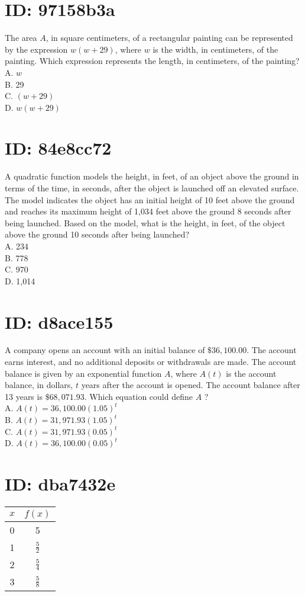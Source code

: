 \section*{ID: 97158b3a}
The area $A$, in square centimeters, of a rectangular painting can be represented by the expression $w(w+29)$, where $w$ is the width, in centimeters, of the painting. Which expression represents the length, in centimeters, of the painting?\\
A. $w$\\
B. 29\\
C. $(w+29)$\\
D. $w(w+29)$

\section*{ID: 84e8cc72}
A quadratic function models the height, in feet, of an object above the ground in terms of the time, in seconds, after the object is launched off an elevated surface. The model indicates the object has an initial height of 10 feet above the ground and reaches its maximum height of 1,034 feet above the ground 8 seconds after being launched. Based on the model, what is the height, in feet, of the object above the ground 10 seconds after being launched?\\
A. 234\\
B. 778\\
C. 970\\
D. 1,014

\section*{ID: d8ace155}
A company opens an account with an initial balance of $\$ 36,100.00$. The account earns interest, and no additional deposits or withdrawals are made. The account balance is given by an exponential function $A$, where $A(t)$ is the account balance, in dollars, $t$ years after the account is opened. The account balance after 13 years is $\$ 68,071.93$. Which equation could define $A$ ?\\
A. $A(t)=36,100.00(1.05)^{t}$\\
B. $A(t)=31,971.93(1.05)^{t}$\\
C. $A(t)=31,971.93(0.05)^{t}$\\
D. $A(t)=36,100.00(0.05)^{t}$

\section*{ID: dba7432e}
\begin{center}
\begin{tabular}{|c|c|}
\hline
$x$ & $f(x)$ \\
\hline
0 & 5 \\
\hline
1 & $\frac{5}{2}$ \\
\hline
2 & $\frac{5}{4}$ \\
\hline
3 & $\frac{5}{8}$ \\
\hline
\end{tabular}
\end{center}

